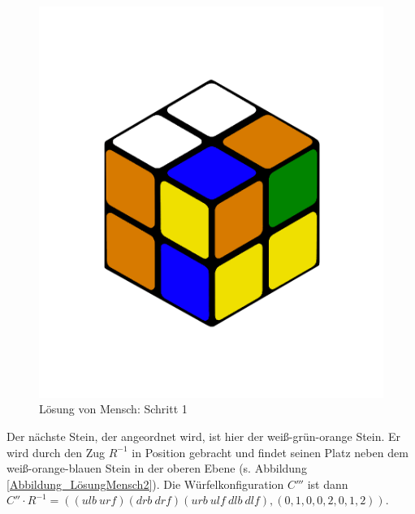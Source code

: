 \documentclass[12pt,a4paper, usenames, dvipsnames]{article}
\theoremstyle{mystyle}
\theoremstyle{definition}
\begin{document}
\begin{figure}[H]
\centering
\includegraphics[scale=0.12]{0201.png}
\caption[Lösung von Mensch: Schritt 1]{Lösung von Mensch: Schritt 1}
\label{Abbildung_LösungMensch1}
\end{figure}

Der nächste Stein, der angeordnet wird, ist hier der weiß-grün-orange Stein. Er wird durch den Zug $R^{-1}$ in Position gebracht und findet seinen Platz neben dem weiß-orange-blauen Stein in der oberen Ebene (s. Abbildung \ref{Abbildung_LösungMensch2}). Die Würfelkonfiguration $C'''$ ist dann $C'' \cdot R^{-1} = (( \textit{ulb} \ \textit{urf} )( \textit{drb} \ \textit{drf} )( \textit{urb} \ \textit{ulf} \ \textit{dlb} \ \textit{dlf}),(0,1,0,0,2,0,1,2))$.
 
\end{document}
